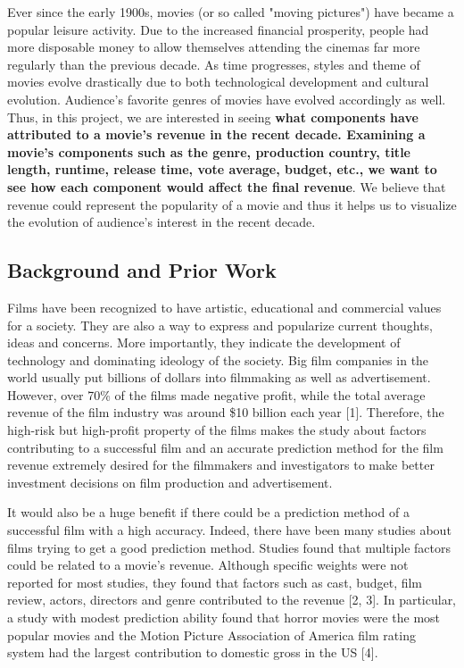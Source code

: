 \documentclass[11pt]{article}
\begin{document}
    Ever since the early 1900s, movies (or so called "moving pictures") have
became a popular leisure activity. Due to the increased financial
prosperity, people had more disposable money to allow themselves
attending the cinemas far more regularly than the previous decade. As
time progresses, styles and theme of movies evolve drastically due to
both technological development and cultural evolution. Audience's
favorite genres of movies have evolved accordingly as well. Thus, in
this project, we are interested in seeing \textbf{what components have
attributed to a movie's revenue in the recent decade. Examining a
movie's components such as the genre, production country, title length,
runtime, release time, vote average, budget, etc., we want to see how
each component would affect the final revenue}. We believe that revenue
could represent the popularity of a movie and thus it helps us to
visualize the evolution of audience's interest in the recent decade.

    \subsection{Background and Prior Work}\label{background-and-prior-work}

    Films have been recognized to have artistic, educational and commercial
values for a society. They are also a way to express and popularize
current thoughts, ideas and concerns. More importantly, they indicate
the development of technology and dominating ideology of the society.
Big film companies in the world usually put billions of dollars into
filmmaking as well as advertisement. However, over 70\% of the films
made negative profit, while the total average revenue of the film
industry was around \$10 billion each year {[}1{]}. Therefore, the
high-risk but high-profit property of the films makes the study about
factors contributing to a successful film and an accurate prediction
method for the film revenue extremely desired for the filmmakers and
investigators to make better investment decisions on film production and
advertisement.

It would also be a huge benefit if there could be a prediction method of
a successful film with a high accuracy. Indeed, there have been many
studies about films trying to get a good prediction method. Studies
found that multiple factors could be related to a movie's revenue.
Although specific weights were not reported for most studies, they found
that factors such as cast, budget, film review, actors, directors and
genre contributed to the revenue {[}2, 3{]}. In particular, a study with
modest prediction ability found that horror movies were the most popular
movies and the Motion Picture Association of America film rating system
had the largest contribution to domestic gross in the US {[}4{]}.
\end{document}
